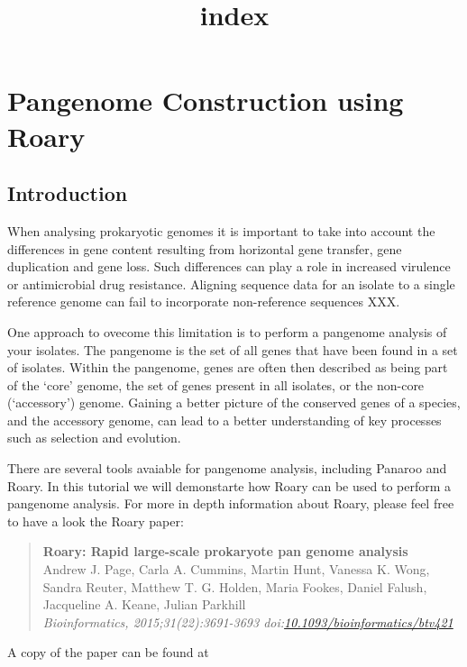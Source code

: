 \documentclass[11pt]{article}
\title{index}
\begin{document}
    \hypertarget{pangenome-construction-using-roary}{%
\section{Pangenome Construction using
Roary}\label{pangenome-construction-using-roary}}

\hypertarget{introduction}{%
\subsection{Introduction}\label{introduction}}

When analysing prokaryotic genomes it is important to take into account
the differences in gene content resulting from horizontal gene transfer,
gene duplication and gene loss. Such differences can play a role in
increased virulence or antimicrobial drug resistance. Aligning sequence
data for an isolate to a single reference genome can fail to incorporate
non-reference sequences XXX.

One approach to ovecome this limitation is to perform a pangenome
analysis of your isolates. The pangenome is the set of all genes that
have been found in a set of isolates. Within the pangenome, genes are
often then described as being part of the `core' genome, the set of
genes present in all isolates, or the non-core (`accessory') genome.
Gaining a better picture of the conserved genes of a species, and the
accessory genome, can lead to a better understanding of key processes
such as selection and evolution.

There are several tools avaiable for pangenome analysis, including
Panaroo and Roary. In this tutorial we will demonstarte how Roary can be
used to perform a pangenome analysis. For more in depth information
about Roary, please feel free to have a look the Roary paper:

\begin{quote}
\textbf{Roary: Rapid large-scale prokaryote pan genome analysis}\\
Andrew J. Page, Carla A. Cummins, Martin Hunt, Vanessa K. Wong, Sandra
Reuter, Matthew T. G. Holden, Maria Fookes, Daniel Falush, Jacqueline A.
Keane, Julian Parkhill\\
\textit{Bioinformatics, 2015;31(22):3691-3693
doi:\href{http://bioinformatics.oxfordjournals.org/content/31/22/3691}{10.1093/bioinformatics/btv421}}
\end{quote}

A copy of the paper can be found at
\end{document}

